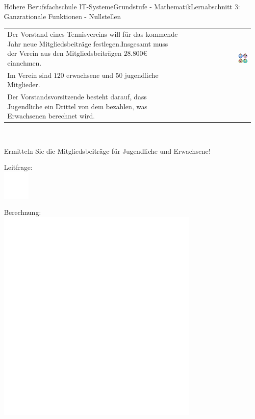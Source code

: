 \documentclass[oneside,openany,headings=optiontotoc,11pt,numbers=noenddot]{scrreprt}
\begin{document}
\begin{worksheet}{Höhere Berufsfachschule IT-Systeme}{Grundstufe - Mathematik}{Lernabschnitt 3: Ganzrationale Funktionen - Nullstellen}
\begin{framed}
		\end{framed}
		\normalsize
		\newpage
		\begin{framed}
			\noindent
			\begin{tabularx}{\textwidth}{Xr}
				Der Vorstand eines Tennisvereins will für das kommende Jahr neue Mitgliedsbeiträge festlegen.Insgesamt muss der Verein aus den Mitgliedsbeiträgen \(28.800\)\euro{} einnehmen. & \multirow{2}{*}{\includegraphics[width=0.15\textwidth,align=b]{../99_Bilder/sporty.jpg}}\\
				Im Verein sind \(120\) erwachsene und \(50\) jugendliche Mitglieder. & \\
				Der Vorstandsvorsitzende besteht darauf, dass Jugendliche ein Drittel von dem bezahlen, was Erwachsenen berechnet wird.\\
			\end{tabularx}\\
			\par\noindent
			Ermitteln Sie die Mitgliedsbeiträge für Jugendliche und Erwachsene!
		\end{framed}
		\begin{framed}
			\noindent
			\small{\color{codegray}Leitfrage:}\\
			\includegraphics[width=0.1\textwidth]{../../empty.jpg}\\
		\end{framed}
		\begin{framed}
			\noindent
			\small{\color{codegray}Berechnung:}\\
			\includegraphics[width=0.75\textwidth]{../../empty.jpg}
		\end{framed}
		\newpage
		

\end{worksheet}
\end{document}
